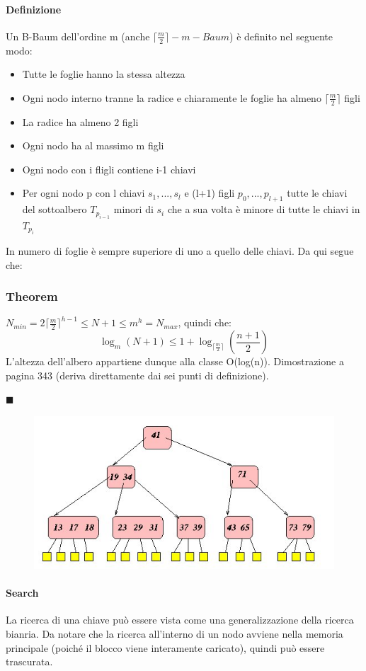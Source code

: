 \documentclass[a4paper]{book}
\newenvironment{mytheorem}[1]{\subsubsection*{Theorem #1}}{\begin{flushright}$\blacksquare$\end{flushright}}
\begin{document}
\paragraph{Definizione} Un B-Baum dell'ordine m (anche $\lceil \frac{m}{2} \rceil -m-Baum$) è definito nel seguente modo:
\begin{itemize}
\item Tutte le foglie hanno la stessa altezza
\item Ogni nodo interno tranne la radice e chiaramente le foglie ha almeno $\lceil \frac{m}{2}\rceil$ figli
\item La radice ha almeno 2 figli
\item Ogni nodo ha al massimo m figli
\item Ogni nodo con i fligli contiene i-1 chiavi
\item Per ogni nodo p con l chiavi $s_1, ..., s_l$ e (l+1) figli $p_0, ..., p_{l+1}$ tutte le chiavi del sottoalbero $T_{p_{i-1}}$ minori di $s_i$ che a sua volta è minore di tutte le chiavi in $T_{p_i}$
\end{itemize}
In numero di foglie è sempre superiore di uno a quello delle chiavi. Da qui segue che:
\begin{mytheorem}{}
$N_{min}=2\lceil\frac{m}{2}\rceil ^{h-1}\leq N+1\leq m^h=N_{max}$, quindi che:
$$\log_m(N+1)\leq 1+\log_{\lceil \frac{m}{2}\rceil} \left(\frac{n+1}{2}\right)$$
L'altezza dell'albero appartiene dunque alla classe O(log(n)). Dimostrazione a pagina 343 (deriva direttamente dai sei punti di definizione).
\end{mytheorem}
\begin{figure}[H]
\centering
\includegraphics[scale=0.7]{Figures/bbaumex.jpg}
\end{figure}
\paragraph{Search}
La ricerca di una chiave può essere vista come una generalizzazione della ricerca bianria. Da notare che la ricerca all'interno di un nodo avviene nella memoria principale (poiché il blocco viene interamente caricato), quindi può essere trascurata.
\end{document}
